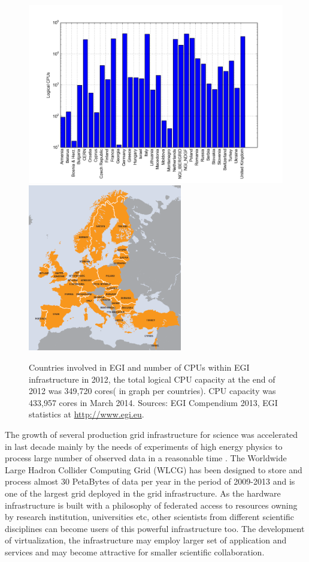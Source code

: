 \begin{figure}[htb]
    \centering
    \includegraphics[width=1\textwidth]{chapter2/egicpus.png}
    \includegraphics[width=0.6\textwidth]{chapter2/egi.png}
    \caption{Countries involved in EGI and number of CPUs within EGI infrastructure in 2012, the total logical CPU capacity at the end of 2012 was 349,720 cores( in graph per countries). CPU capacity was 433,957 cores in March 2014. Sources: EGI Compendium 2013, EGI statistics at \url{http://www.egi.eu}.%
    }
    \label{fig:egi}
\end{figure}

The growth of several production grid infrastructure for science was accelerated in last decade mainly by the needs of experiments of high energy physics to process large number of observed data in a reasonable time \cite{Bird2009}. The Worldwide Large Hadron Collider Computing Grid (WLCG) has been designed to store and process almost 30 PetaBytes of data per year in the period of 2009-2013  \cite{Adamova2014} and is one of the largest grid deployed in the grid infrastructure. As the hardware infrastructure is built with a philosophy of federated access to resources owning by research institution, universities etc, other scientists from different scientific disciplines can become users of this powerful infrastructure too. The development of virtualization, the infrastructure may employ larger set of application and services and may become attractive for smaller scientific collaboration.

